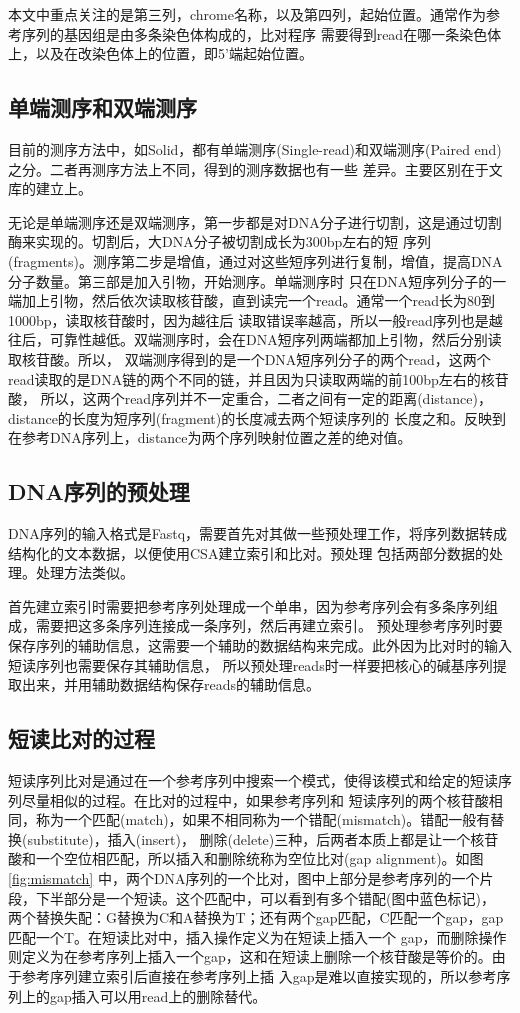 本文中重点关注的是第三列，chrome名称，以及第四列，起始位置。通常作为参考序列的基因组是由多条染色体构成的，比对程序
需要得到read在哪一条染色体上，以及在改染色体上的位置，即5'端起始位置。

\subsection{单端测序和双端测序}
目前的测序方法中，如Solid，都有单端测序(Single-read)和双端测序(Paired end)之分。二者再测序方法上不同，得到的测序数据也有一些
差异。主要区别在于文库的建立上。

无论是单端测序还是双端测序，第一步都是对DNA分子进行切割，这是通过切割酶来实现的。切割后，大DNA分子被切割成长为300bp左右的短
序列(fragments)。测序第二步是增值，通过对这些短序列进行复制，增值，提高DNA分子数量。第三部是加入引物，开始测序。单端测序时
只在DNA短序列分子的一端加上引物，然后依次读取核苷酸，直到读完一个read。通常一个read长为80到1000bp，读取核苷酸时，因为越往后
读取错误率越高，所以一般read序列也是越往后，可靠性越低。双端测序时，会在DNA短序列两端都加上引物，然后分别读取核苷酸。所以，
双端测序得到的是一个DNA短序列分子的两个read，这两个read读取的是DNA链的两个不同的链，并且因为只读取两端的前100bp左右的核苷酸，
所以，这两个read序列并不一定重合，二者之间有一定的距离(distance)，distance的长度为短序列(fragment)的长度减去两个短读序列的
长度之和。反映到在参考DNA序列上，distance为两个序列映射位置之差的绝对值。

\subsection{DNA序列的预处理}
DNA序列的输入格式是Fastq，需要首先对其做一些预处理工作，将序列数据转成结构化的文本数据，以便使用CSA建立索引和比对。预处理
包括两部分数据的处理。处理方法类似。

首先建立索引时需要把参考序列处理成一个单串，因为参考序列会有多条序列组成，需要把这多条序列连接成一条序列，然后再建立索引。
预处理参考序列时要保存序列的辅助信息，这需要一个辅助的数据结构来完成。此外因为比对时的输入短读序列也需要保存其辅助信息，
所以预处理reads时一样要把核心的碱基序列提取出来，并用辅助数据结构保存reads的辅助信息。

\subsection{短读比对的过程}
短读序列比对是通过在一个参考序列中搜索一个模式，使得该模式和给定的短读序列尽量相似的过程。在比对的过程中，如果参考序列和
短读序列的两个核苷酸相同，称为一个匹配(match)，如果不相同称为一个错配(mismatch)。错配一般有替换(substitute)，插入(insert)，
删除(delete)三种，后两者本质上都是让一个核苷酸和一个空位相匹配，所以插入和删除统称为空位比对(gap alignment)。如图\ref{fig:mismatch}
中，两个DNA序列的一个比对，图中上部分是参考序列的一个片段，下半部分是一个短读。这个匹配中，可以看到有多个错配(图中蓝色标记)，
两个替换失配：G替换为C和A替换为T；还有两个gap匹配，C匹配一个gap，gap匹配一个T。在短读比对中，插入操作定义为在短读上插入一个
gap，而删除操作则定义为在参考序列上插入一个gap，这和在短读上删除一个核苷酸是等价的。由于参考序列建立索引后直接在参考序列上插
入gap是难以直接实现的，所以参考序列上的gap插入可以用read上的删除替代。

